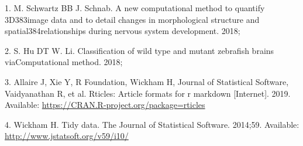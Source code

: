 \documentclass[10pt,letterpaper]{article}
\begin{document}
\hypertarget{refs}{}
\leavevmode\hypertarget{ref-Schwartz18}{}%
1. M. Schwartz BB J. Schnab. A new computational method to quantify
3D383image data and to detail changes in morphological structure and
spatial384relationships during nervous system development. 2018;

\leavevmode\hypertarget{ref-Hu18}{}%
2. S. Hu DT W. Li. Classification of wild type and mutant zebrafish
brains viaComputational method. 2018;

\leavevmode\hypertarget{ref-rticles19}{}%
3. Allaire J, Xie Y, R Foundation, Wickham H, Journal of Statistical
Software, Vaidyanathan R, et al. Rticles: Article formats for r markdown
{[}Internet{]}. 2019. Available:
\url{https://CRAN.R-project.org/package=rticles}

\leavevmode\hypertarget{ref-tidy-data}{}%
4. Wickham H. Tidy data. The Journal of Statistical Software. 2014;59.
Available: \url{http://www.jstatsoft.org/v59/i10/}

\nolinenumbers
\end{document}
